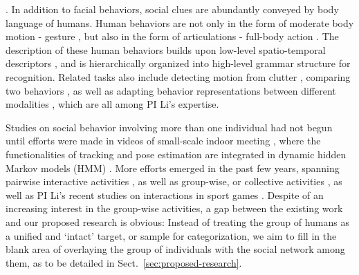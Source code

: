 . In addition to facial behaviors, social clues are abundantly conveyed by body language of humans. Human behaviors are not only in the form of moderate body motion - gesture \cite{Mitra:gesture}, but also in the form of articulations - full-body action \cite{Ryoo:action,Poppe}. The description of these human behaviors builds upon low-level spatio-temporal descriptors \cite{Dalal:HOG,Dollar:STIP,Laptev:STIP,Brox:flow}, and is hierarchically organized into high-level grammar structure \cite{Niebles2007,Niebles2006} for recognition.  Related tasks also include detecting motion from clutter \cite{Li2010}, comparing two behaviors \cite{LiPAMI 2012}, as well as adapting behavior representations between different modalities \cite{LiZickler2012,Li2011}, which are all among PI Li's expertise.

Studies on social behavior involving more than one individual had not begun until efforts were made in videos of small-scale indoor meeting \cite{GaticaPerez,McCowan:meeting}, where the functionalities of tracking \cite{Smith:track} and pose estimation \cite{Ba:meeting} are integrated in dynamic hidden Markov models (HMM) \cite{Zhang:meeting}. More efforts emerged in the past few years, spanning pairwise interactive activities \cite{UTdata}, as well as group-wise, or collective activities \cite{Choi:context,Choi:recogtrack,Amer:group,Lan:Group}, as well as PI Li's recent studies on interactions in sport games \cite{LiIJCV2012}.  Despite of an increasing interest in the group-wise activities, a gap between the existing work and our proposed research is obvious: Instead of treating the group of humans as a unified and `intact' target, or sample for categorization, we aim to fill in the blank area of overlaying the group of individuals with the social network among them, as to be detailed in Sect.~\ref{sec:proposed-research}.


